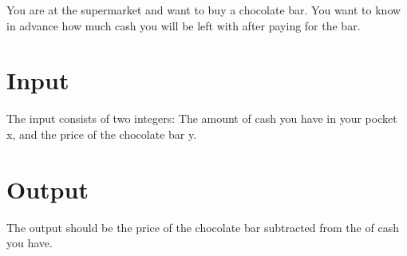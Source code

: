 

You are at the supermarket and want to buy a chocolate bar. You want to know in advance how much cash you will be left with after paying for the bar.

\section*{Input}

The input consists of two integers: The amount of cash you have in your pocket x, and the price of the chocolate bar y.

\section*{Output}

The output should be the price of the chocolate bar subtracted from the of cash you have.